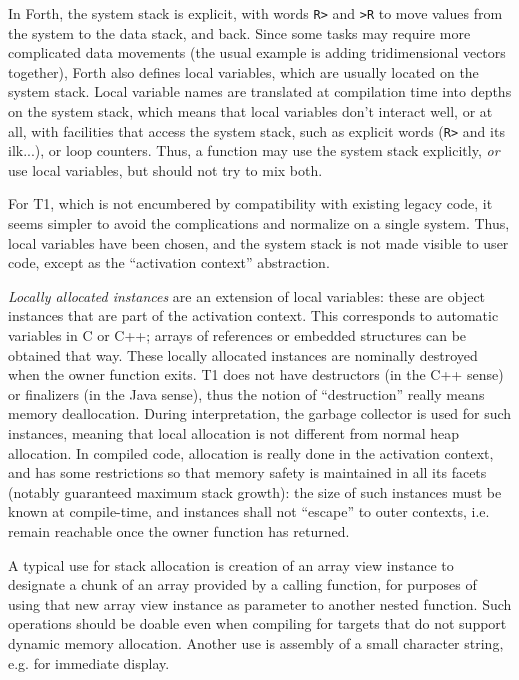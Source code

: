 \begin{rationale}
In Forth, the system stack is explicit, with words \verb|R>| and
\verb|>R| to move values from the system to the data stack, and back.
Since some tasks may require more complicated data movements (the usual
example is adding tridimensional vectors together), Forth also defines
local variables, which are usually located on the system stack. Local
variable names are translated at compilation time into depths on the
system stack, which means that local variables don't interact well, or
at all, with facilities that access the system stack, such as explicit
words (\verb|R>| and its ilk...), or loop counters. Thus, a function
may use the system stack explicitly, \emph{or} use local variables,
but should not try to mix both.

For T1, which is not encumbered by compatibility with existing legacy
code, it seems simpler to avoid the complications and normalize on a
single system. Thus, local variables have been chosen, and the system
stack is not made visible to user code, except as the ``activation
context'' abstraction.
\end{rationale}

\emph{Locally allocated instances} are an extension of local variables:
these are object instances that are part of the activation context. This
corresponds to automatic variables in C or C++; arrays of references or
embedded structures can be obtained that way. These locally allocated
instances are nominally destroyed when the owner function exits. T1 does
not have destructors (in the C++ sense) or finalizers (in the Java
sense), thus the notion of ``destruction'' really means memory
deallocation. During interpretation, the garbage collector is used for
such instances, meaning that local allocation is not different from
normal heap allocation. In compiled code, allocation is really done in
the activation context, and has some restrictions so that memory safety
is maintained in all its facets (notably guaranteed maximum stack
growth): the size of such instances must be known at compile-time, and
instances shall not ``escape'' to outer contexts, i.e. remain reachable
once the owner function has returned.

\begin{rationale}
A typical use for stack allocation is creation of an array view instance
to designate a chunk of an array provided by a calling function, for
purposes of using that new array view instance as parameter to another
nested function. Such operations should be doable even when compiling
for targets that do not support dynamic memory allocation. Another use
is assembly of a small character string, e.g. for immediate display.
\end{rationale}

